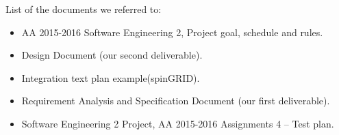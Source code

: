List of the documents we referred to:
\begin{itemize}
    \item AA 2015-2016 Software Engineering 2, Project goal, schedule and rules.
    \item Design Document (our second deliverable).
    \item Integration text plan example(spinGRID).
    \item Requirement Analysis and Specification Document (our first deliverable).
    \item Software Engineering 2 Project, AA 2015-2016 Assignments 4 – Test plan.
\end{itemize}
